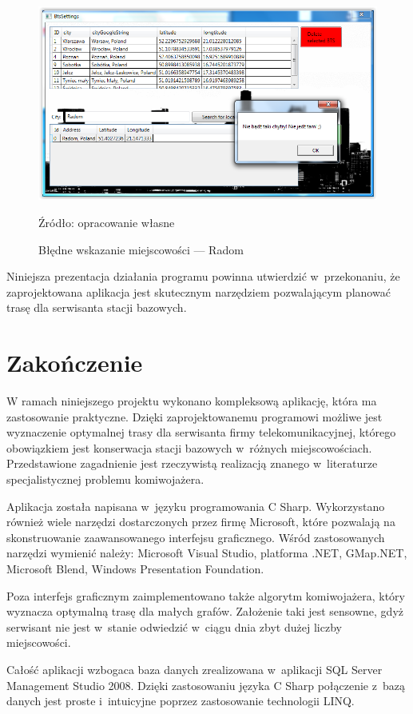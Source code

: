 \documentclass[12pt,a4paper]{report}
\begin{document}
\begin{figure}[!bht]
\centering
\includegraphics[scale=0.5]{Pictures/Radom.png}
\label{fig: Radom}
\caption{Błędne wskazanie miejscowości --- Radom}{Źródło: opracowanie własne}
\end{figure}
\newpage
Niniejsza prezentacja działania programu powinna utwierdzić w~przekonaniu, że zaprojektowana aplikacja jest skutecznym narzędziem pozwalającym planować trasę dla serwisanta stacji bazowych.

\chapter{Zakończenie}
W ramach niniejszego projektu wykonano kompleksową aplikację, która ma zastosowanie praktyczne. Dzięki zaprojektowanemu programowi możliwe jest wyznaczenie optymalnej trasy dla serwisanta firmy telekomunikacyjnej, którego obowiązkiem jest konserwacja stacji bazowych w~różnych miejscowościach. Przedstawione zagadnienie jest rzeczywistą realizacją znanego w~literaturze specjalistycznej problemu komiwojażera.

Aplikacja została napisana w~języku programowania C Sharp. Wykorzystano również wiele narzędzi dostarczonych przez firmę Microsoft, które pozwalają na skonstruowanie zaawansowanego interfejsu graficznego. Wśród zastosowanych narzędzi wymienić należy: Microsoft Visual Studio, platforma .NET, GMap.NET, Microsoft Blend, Windows Presentation Foundation.

Poza interfejs graficznym zaimplementowano także algorytm komiwojażera, który wyznacza optymalną trasę dla małych grafów. Założenie taki jest sensowne, gdyż serwisant nie jest w~stanie odwiedzić w~ciągu dnia zbyt dużej liczby miejscowości. 

Całość aplikacji wzbogaca baza danych zrealizowana w~aplikacji SQL Server Management Studio 2008. Dzięki zastosowaniu języka C Sharp połączenie z~bazą danych jest proste i~intuicyjne poprzez zastosowanie technologii LINQ.
\end{document}

